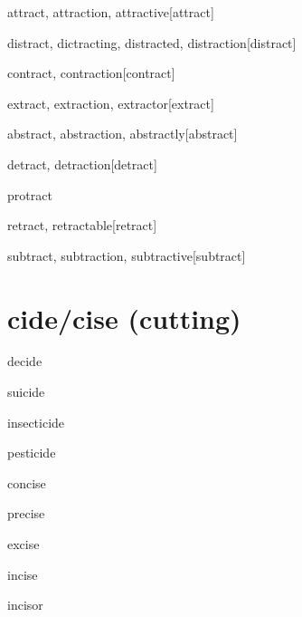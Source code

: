 \begin{RefWord}{attract, attraction, attractive}[attract]
\end{RefWord}

\begin{RefWord}{distract, dictracting, distracted, distraction}[distract]
\end{RefWord}

\begin{RefWord}{contract, contraction}[contract]
\end{RefWord}

\begin{RefWord}{extract, extraction, extractor}[extract]
\end{RefWord}

\begin{RefWord}{abstract, abstraction, abstractly}[abstract]
\end{RefWord}

\begin{RefWord}{detract, detraction}[detract]
\end{RefWord}

\begin{RefWord}{protract} 
\end{RefWord}

\begin{RefWord}{retract, retractable}[retract]
\end{RefWord}

\begin{RefWord}{subtract, subtraction, subtractive}[subtract]
\end{RefWord}

\section{cide/cise (cutting)}

\begin{RefWord}{decide}
\end{RefWord}

\begin{RefWord}{suicide}
\end{RefWord}

\begin{RefWord}{insecticide}
\end{RefWord}

\begin{RefWord}{pesticide}
\end{RefWord}

\begin{RefWord}{concise}
\end{RefWord}

\begin{RefWord}{precise}
\end{RefWord}

\begin{RefWord}{excise}
\end{RefWord}

\begin{RefWord}{incise}
\end{RefWord}

\begin{RefWord}{incisor}
\end{RefWord}




